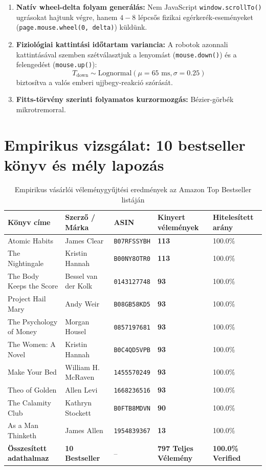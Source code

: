 \documentclass[11pt,a4paper]{article}
\begin{document}
\begin{enumerate}
    \item \textbf{Natív wheel-delta folyam generálás:} Nem JavaScript \texttt{window.scrollTo()} ugrásokat hajtunk végre, hanem $4-8$ lépcsős fizikai egérkerék-eseményeket (\texttt{page.mouse.wheel(0, delta)}) küldünk.
    \item \textbf{Fiziológiai kattintási időtartam variancia:} A robotok azonnali kattintásával szemben szétválasztjuk a lenyomást (\texttt{mouse.down()}) és a felengedést (\texttt{mouse.up()}):
    \begin{equation}
    T_{\text{down}} \sim \text{Lognormal}(\mu = 65\text{ ms}, \sigma = 0.25)
    \end{equation}
    biztosítva a valós emberi ujjbegy-reakció szórását.
    \item \textbf{Fitts-törvény szerinti folyamatos kurzormozgás:} Bézier-görbék mikrotremorral.
\end{enumerate}

\section{Empirikus vizsgálat: 10 bestseller könyv és mély lapozás}

\begin{table}[h!]
\centering
\small
\begin{tabular}{lllll}
\toprule
\textbf{Könyv címe} & \textbf{Szerző / Márka} & \textbf{ASIN} & \textbf{Kinyert vélemények} & \textbf{Hitelesített arány} \\ \midrule
Atomic Habits & James Clear & \texttt{B07RFSSYBH} & \textbf{113} & 100.0\% \\
The Nightingale & Kristin Hannah & \texttt{B00NY8OTR0} & \textbf{113} & 100.0\% \\
The Body Keeps the Score & Bessel van der Kolk & \texttt{0143127748} & \textbf{93} & 100.0\% \\
Project Hail Mary & Andy Weir & \texttt{B08GB58KD5} & \textbf{93} & 100.0\% \\
The Psychology of Money & Morgan Housel & \texttt{0857197681} & \textbf{93} & 100.0\% \\
The Women: A Novel & Kristin Hannah & \texttt{B0C4QD5VPB} & \textbf{93} & 100.0\% \\
Make Your Bed & William H. McRaven & \texttt{1455570249} & \textbf{93} & 100.0\% \\
Theo of Golden & Allen Levi & \texttt{1668236516} & \textbf{93} & 100.0\% \\
The Calamity Club & Kathryn Stockett & \texttt{B0FTB8MDVN} & \textbf{90} & 100.0\% \\
As a Man Thinketh & James Allen & \texttt{1954839367} & \textbf{13} & 100.0\% \\ \midrule
\textbf{Összesített adathalmaz} & \textbf{10 Bestseller} & -- & \textbf{797 Teljes Vélemény} & \textbf{100.0\% Verified} \\ \bottomrule
\end{tabular}
\caption{Empirikus vásárlói véleménygyűjtési eredmények az Amazon Top Bestseller listáján}
\end{table}
\end{document}

